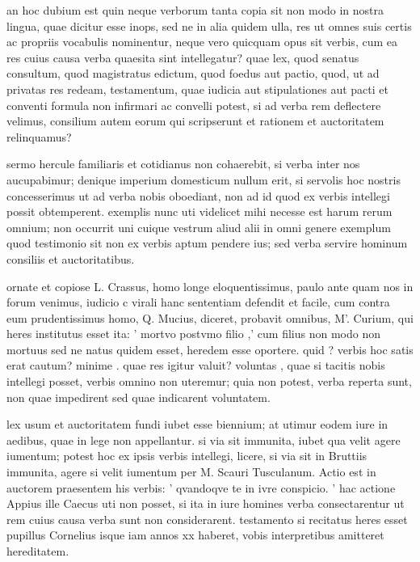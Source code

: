  an hoc dubium est quin neque verborum tanta copia sit non modo in nostra lingua, quae dicitur esse inops, sed ne in alia quidem ulla, res ut omnes suis certis ac propriis vocabulis nominentur, neque vero quicquam opus sit verbis, cum ea res cuius causa verba quaesita sint intellegatur? quae lex, quod senatus consultum, quod magistratus edictum, quod foedus aut pactio, quod, ut ad privatas res redeam, testamentum, quae iudicia aut stipulationes aut pacti et conventi formula non infirmari ac convelli potest, si ad verba rem deflectere velimus, consilium autem eorum qui scripserunt et rationem et auctoritatem relinquamus?

 sermo hercule familiaris et cotidianus non cohaerebit, si verba inter nos aucupabimur; denique imperium domesticum nullum erit, si servolis hoc nostris concesserimus ut ad verba nobis oboediant, non ad id quod ex verbis intellegi possit obtemperent. exemplis nunc uti videlicet mihi necesse est harum rerum omnium; non occurrit uni cuique vestrum aliud alii in omni genere exemplum quod testimonio sit non ex verbis aptum pendere ius; sed verba servire hominum consiliis et auctoritatibus.

 ornate et copiose L. Crassus, homo longe eloquentissimus, paulo ante quam nos in forum venimus, iudicio c virali hanc sententiam defendit et facile, cum contra eum prudentissimus homo, Q. Mucius, diceret, probavit omnibus, M'. Curium, qui heres institutus esset ita: ' mortvo postvmo filio ,' cum filius non modo non mortuus sed ne natus quidem esset, heredem esse oportere. quid ? verbis hoc satis erat cautum? minime . quae res igitur valuit? voluntas , quae si tacitis nobis intellegi posset, verbis omnino non uteremur; quia non potest, verba reperta sunt, non quae impedirent sed quae indicarent voluntatem.

 lex usum et auctoritatem fundi iubet esse biennium; at utimur eodem iure in aedibus, quae in lege non appellantur. si via sit immunita, iubet qua velit agere iumentum; potest hoc ex ipsis verbis intellegi, licere, si via sit in Bruttiis immunita, agere si velit iumentum per M. Scauri Tusculanum. Actio est in auctorem praesentem his verbis: ' qvandoqve te in ivre conspicio. ' hac actione Appius ille Caecus uti non posset, si ita in iure homines verba consectarentur ut rem cuius causa verba sunt non considerarent. testamento si recitatus heres esset pupillus Cornelius isque iam annos xx haberet, vobis interpretibus amitteret hereditatem.

